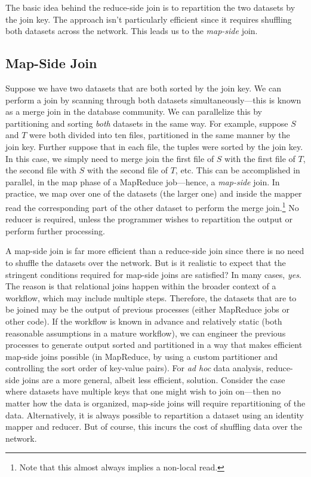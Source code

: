 The basic idea behind the reduce-side join is to repartition the two
datasets by the join key.  The approach isn't particularly efficient
since it requires shuffling both datasets across the network.  This
leads us to the \emph{map-side} join.

\subsection{Map-Side Join}

Suppose we have two datasets that are both sorted by the join key.  We
can perform a join by scanning through both datasets
simultaneously---this is known as a merge join in the database
community.  We can parallelize this by partitioning and sorting \emph{
  both} datasets in the same way.  For example, suppose $S$ and $T$
were both divided into ten files, partitioned in the same manner by
the join key.  Further suppose that in each file, the tuples were
sorted by the join key.  In this case, we simply need to merge join
the first file of $S$ with the first file of $T$, the second file with
$S$ with the second file of $T$, etc.  This can be accomplished in
parallel, in the map phase of a MapReduce job---hence, a \emph{
  map-side} join.  In practice, we map over one of the datasets (the
larger one) and inside the mapper read the corresponding part of the
other dataset to perform the merge join.\footnote{Note that this
  almost always implies a non-local read.}  No reducer is required,
unless the programmer wishes to repartition the output or perform
further processing.

A map-side join is far more efficient than a reduce-side join since
there is no need to shuffle the datasets over the network.  But is it
realistic to expect that the stringent conditions required for
map-side joins are satisfied?  In many cases, \emph{yes}.  The reason
is that relational joins happen within the broader context of a
workflow, which may include multiple steps.  Therefore, the datasets
that are to be joined may be the output of previous processes (either
MapReduce jobs or other code).  If the workflow is known in advance
and relatively static (both reasonable assumptions in a mature
workflow), we can engineer the previous processes to generate
output sorted and partitioned in a way that makes efficient map-side
joins possible (in MapReduce, by using a custom partitioner and
controlling the sort order of key-value pairs).  For \emph{ad hoc} data
analysis, reduce-side joins are a more general, albeit less efficient,
solution.  Consider the case where datasets have multiple keys that
one might wish to join on---then no matter how the data is organized,
map-side joins will require repartitioning of the data.
Alternatively, it is always possible to repartition a dataset using an
identity mapper and reducer.  But of course, this incurs the cost of
shuffling data over the network.

